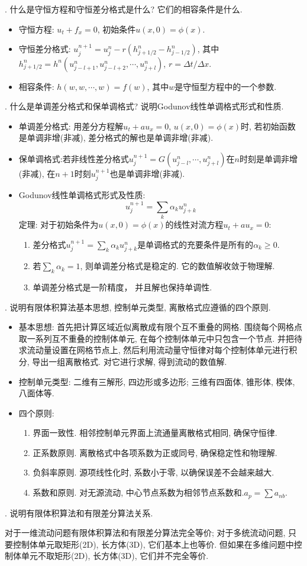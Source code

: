 . 什么是守恒方程和守恒差分格式是什么? 它们的相容条件是什么.
\begin{itemize}
\item 守恒方程: $u_t+f_x=0$, 初始条件$u(x,0)=\phi(x)$.
\item 守恒差分格式: $u_j^{n+1}=u_j^n-r(h_{j+1/2}^n-h_{j-1/2}^n)$, 其中$h_{j+1/2}^n=h^n(u_{j-l+1}^n, u_{j-l+2}^n, \cdots, u_{j+l}^n)$, $r=\Delta t/\Delta x$.
\item 相容条件: $h(w,w,\cdots,w)=f(w)$, 其中$w$是守恒型方程中的一个参数.
\end{itemize}
\vspace{1em}

. 什么是单调差分格式和保单调格式? 说明Godunov线性单调格式形式和性质.
\begin{itemize}
\item 单调差分格式: 用差分方程解$u_t+au_x=0$, $u(x,0)=\phi(x)$时, 若初始函数是单调非增(非减), 差分格式的解也是单调非增(非减).
\item 保单调格式:若非线性差分格式$u_j^{n+1}=G(u_{j-l}^n,\cdots, u_{j+l}^n)$在$n$时刻是单调非增(非减), 在$n+1$时刻$u_j^{n+1}$也是单调非增(非减).
\item Godunov线性单调格式形式及性质:
\[
u_j^{n+1} = \sum_k\alpha_ku_{j+k}^n
\]
定理: 对于初始条件为$u(x,0)=\phi(x)$的线性对流方程$u_t+au_x=0$:
\begin{enumerate}
\item 差分格式$u_j^{n+1} = \sum_k\alpha_ku_{j+k}^n$是单调格式的充要条件是所有的$\alpha_k\geq 0$.
\item 若$\sum_k\alpha_k=1$, 则单调差分格式是稳定的. 它的数值解收敛于物理解.
\item 单调差分格式是一阶精度， 并且解也保持单调性.
\end{enumerate}

\end{itemize}

\vspace{1em}
. 说明有限体积算法基本思想, 控制单元类型, 离散格式应遵循的四个原则.
\begin{itemize}
\item 基本思想: 首先把计算区域近似离散成有限个互不重叠的网格. 围绕每个网格点取一系列互不重叠的控制体单元, 在每个控制体单元中只包含一个节点. 并把待求流动量设置在网格节点上, 然后利用流动量守恒律对每个控制体单元进行积分, 导出一组离散格式. 对它进行求解, 得到流动的数值解.
\item 控制单元类型: 二维有三解形, 四边形或多边形; 三维有四面体, 锥形体, 楔体, 八面体等.
\item 四个原则:
       \begin{enumerate}
       \item 界面一致性. 相邻控制单元界面上流通量离散格式相同, 确保守恒律.
       \item 正系数原则. 离散格式中各项系数为正或同号, 确保稳定性和物理解.
       \item 负斜率原则. 源项线性化时, 系数小于零, 以确保误差不会越来越大.
       \item 系数和原则. 对无源流动, 中心节点系数为相邻节点系数和.$a_p=\sum a_{nb}$.
       \end{enumerate}
\end{itemize}
\vspace{1em}

. 说明有限体积算法和有限差分算法关系.

对于一维流动问题有限体积算法和有限差分算法完全等价; 对于多统流动问题, 只要控制体单元取矩形(2D), 长方体(3D), 它们基本上也等价. 但如果在多维问题中控制体单元不取矩形(2D), 长方体(3D), 它们并不完全等价.
